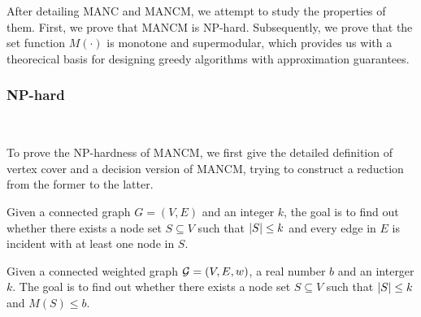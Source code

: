 \documentclass[sigconf]{acmart}
\begin{document}
After detailing MANC and MANCM, we attempt to study the properties of them. First, we prove that MANCM is NP-hard.
Subsequently, we prove that the set function \(M(\cdot)\) is monotone and supermodular, which provides us with a theorecical basis for designing greedy algorithms with approximation guarantees.

\subsubsection{NP-hard}

\

To prove the NP-hardness of MANCM, we first give the detailed definition of vertex cover and a decision version of MANCM, trying to construct a reduction from the former to the latter.

\begin{problem}
Given a connected graph \(G=(V,E)\) and an integer \(k\), the goal is to find out whether there exists a node set \(S\subseteq V\) such that \(\left|S \right|\le k\) and every edge in \(E\) is incident with at least one node in \(S\).
\end{problem}

\begin{problem}
Given a connected weighted graph \(\mathcal{G}=(V,E,w)\), a real number \(b\) and an interger \(k\).
The goal is to find out whether there exists a node set \(S\subseteq V\) such that \(\left|S \right|\le k\) and \(M(S)\le b\).
\end{problem}
\end{document}
